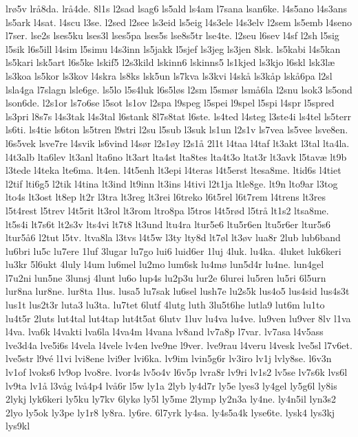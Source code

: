 {lrø5v
lrå8da.
lrå4de.
8l1s
l2sad
lsag6
ls5ald
ls4am
l7sana
lsan6ke.
l4s5ano
l4s3ans
ls5ark
l4sat.
l4scu
l3se.
l2sed
l2see
ls3eid
ls5eig
l4s3ele
l4s3elv
l2sem
ls5emb
l4seno
l7ser.
lse2s
lses5ku
lses3l
lses5pa
lses5s
lse8s5tr
lse4te.
l2seu
l6sev
l4sf
l2sh
l5sig
l5sik
l6s5ill
l4sim
l5simu
l4s3inn
ls5jakk
l5sjef
ls3jeg
ls3jen
8lsk.
ls5kabi
l4s5kan
ls5kari
lsk5art
l6s5ke
lskif5
l2s3kild
lskinn6
lskinns5
ls1kjed
ls3kjo
l6skl
lsk3læ
ls3koa
ls5kor
ls3kov
l4skra
ls8ks
lsk5un
ls7kva
ls3kvi
l4skå
ls3kåp
lskå6pa
l2sl
lsla4ga
l7slagn
lsle6ge.
ls5lo
l5s4luk
l6s5løs
l2sm
l5smør
lsmå6la
l2snu
lsok3
ls5ond
lson6de.
l2s1or
ls7o6se
l5sot
ls1ov
l2spa
l9speg
l5spei
l9spel
l5spi
l4spr
l5spred
ls3pri
l8s7s
l4s3tak
l4s3tal
l6stank
8l7s8tat
l6ste.
ls4ted
l4steg
l3ste4i
ls4tel
ls5terr
ls6ti.
ls4tie
ls6ton
ls5tren
l9stri
l2su
l5sub
l3suk
ls1un
l2s1v
ls7vea
ls5vee
lsve8en.
l6s5vek
lsve7re
l4svik
ls6vind
l4sør
l2s1øy
l2s1å
2l1t
l4taa
l4taf
lt3akt
l3tal
lta4la.
l4t3alb
lta6lev
lt3anl
lta6no
lt3art
lta4st
lta8tes
lta4t3o
ltat3r
lt3avk
l5tavæ
lt9b
l3tede
l4teka
lte6ma.
lt4en.
l4t5enh
lt3epi
l4teras
l4t5erst
ltesa8me.
ltid6s
l4tiet
l2tif
lti6g5
l2tik
l4tina
lt3ind
lt9inn
lt3ins
l4tivi
l2t1ja
ltle8ge.
lt9n
lto9ar
l3tog
lto4s
lt3ost
lt8ep
lt2r
l3tra
lt3reg
lt3rei
l6treko
l6t5rel
l6t7rem
l4trens
lt3res
l5t4rest
l5trev
l4t5rit
lt3rol
lt3rom
ltro8pa
l5tros
l4t5rød
l5trå
lt1s2
ltsa8me.
lt5s4i
lt7s6t
lt2s3v
lts4vi
lt7t8
lt3und
ltu4ra
ltur5e6
ltu5r6en
ltu5r6er
ltur5s6
ltur5å6
l2tut
l5tv.
ltva8la
l3tvs
l4t5w
l3ty
lty8d
lt7øl
lt3øv
lua8r
2lub
lub6band
lu6bri
lu5c
lu7ere
1luf
3lugar
lu7go
lui6
luid6er
1luj
4luk.
lu4ka.
4luket
luk6keri
lu3kr
5l6ukt
4luly
l4um
lu6mel
lu2mo
lum6sk
lu4mø
lun5d4r
lu4ne.
lun4gel
l7u2ni
lun5ne
3lunsj
4lunt
lu6o
lup4s
lu2p3u
lur2e
6lurei
lu5ren
lu5ri
6l5urn
lur8na
lur8ne.
lur8ta
1lus.
lusa5
lu7sak
lu6sel
lush7e
lu2s5k
lus4o5
lus4sid
lus4s3t
lus1t
lus2t3r
luta3
lu3ta.
lu7tet
6lutf
4lutg
luth
3lu5t6he
lutla9
lut6m
lu1to
lu4t5r
2luts
lut4tal
lut4tap
lut4t5at
6lutv
1luv
lu4va
lu4ve.
lu9ven
lu9ver
8lv
l1va
l4va.
lva6k
l4vakti
lva6la
l4va4m
l4vana
lv8and
lv7a8p
l7var.
lv7asa
l4v5ass
lve3d4a
lve5i6s
l4vela
l4vele
lv4en
lve9ne
l9ver.
lve9rau
l4veru
l4vesk
lve5sl
l7v6et.
lve5str
l9vé
l1vi
lvi8ene
lvi9er
lvi6ka.
lv9im
lvin5g6r
lv3iro
lv1j
lvly8se.
l6v3n
lv1of
lvoks6
lv9op
lvo8re.
lvor4s
lv5o4v
l6v5p
lvra8r
lv9ri
lv1s2
lv5se
lv7s6k
lvs6l
lv9ta
lv1å
l3våg
lvå4p4
lvå6r
l5w
ly1a
2lyb
ly4d7r
ly5e
lyes3
ly4gel
ly5g6l
ly8is
2lykj
lyk6keri
ly5ku
ly7kv
6lykø
ly5l
ly5me
2lymp
ly2n3a
ly4ne.
ly4n5il
lyn3s2
2lyo
ly5ok
ly3pe
ly1r8
ly8ra.
ly6re.
6l7yrk
ly4sa.
ly4s5a4k
lyse6te.
lysk4
lys3kj
lys9kl
}
